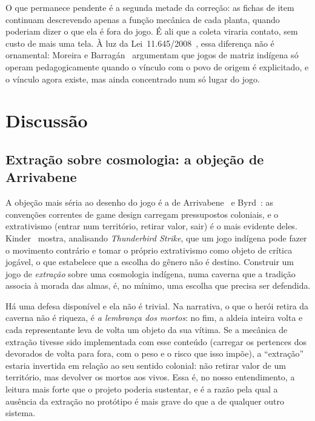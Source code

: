\documentclass[conference]{IEEEtran}
\begin{document}
O que permanece pendente é a segunda metade da correção: as fichas de item continuam
descrevendo apenas a função mecânica de cada planta, quando poderiam dizer o que ela é
fora do jogo. É ali que a coleta viraria contato, sem custo de mais uma tela. À luz da
Lei~11.645/2008~\cite{brasil2008}, essa diferença não é ornamental: Moreira e
Barragán~\cite{moreira2025} argumentam que jogos de matriz indígena só operam
pedagogicamente quando o vínculo com o povo de origem é explicitado, e o vínculo agora
existe, mas ainda concentrado num só lugar do jogo.

\section{Discussão}
\label{sec:discussao}

\subsection{Extração sobre cosmologia: a objeção de Arrivabene}

A objeção mais séria ao desenho do jogo é a de Arrivabene~\cite{arrivabene2025} e
Byrd~\cite{byrd2025}: as convenções correntes de game design carregam pressupostos
coloniais, e o extrativismo (entrar num território, retirar valor, sair) é o mais
evidente deles. Kinder~\cite{kinder2021} mostra, analisando \textit{Thunderbird Strike},
que um jogo indígena pode fazer o movimento contrário e tomar o próprio extrativismo
como objeto de crítica jogável, o que estabelece que a escolha do gênero não é destino.
Construir um jogo de \textit{extração} sobre uma cosmologia indígena, numa caverna que a
tradição associa à morada das almas, é, no mínimo, uma escolha que precisa ser
defendida.

Há uma defesa disponível e ela não é trivial. Na narrativa, o
que o herói retira da caverna não é riqueza, é \textit{a lembrança dos mortos}: no fim,
a aldeia inteira volta e cada representante leva de volta um objeto da sua vítima. Se a
mecânica de extração tivesse sido implementada com esse conteúdo (carregar os pertences
dos devorados de volta para fora, com o peso e o risco que isso impõe), a ``extração''
estaria invertida em relação ao seu sentido colonial: não retirar valor de um
território, mas devolver os mortos aos vivos. Essa é, no nosso entendimento, a leitura
mais forte que o projeto poderia sustentar, e é a razão pela qual a ausência da extração
no protótipo é mais grave do que a de qualquer outro sistema.
\end{document}
